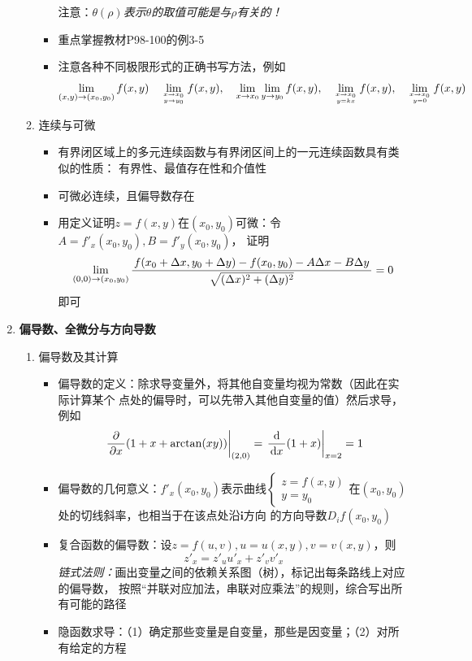 \begin{enumerate}
\begin{enumerate}[(1)]
\begin{itemize}
      注意：{\it $\theta(\rho)$表示$\theta$的取值可能是与$\rho$有关的！}
      \item 重点掌握教材P98-100的例3-5
      \item 注意各种不同极限形式的正确书写方法，例如
      $$\lim\limits_{(x,y)\to(x_0,y_0)}f(x,y)\quad
      \lim\limits_{x\to x_0\atop y\to y_0}f(x,y),\quad
      \lim\limits_{x\to x_0}\lim\limits_{y\to y_0}f(x,y),\quad
      \lim\limits_{x\to x_0\atop y=kx}f(x,y),\quad
      \lim\limits_{x\to x_0\atop y=0}f(x,y)
      $$
    \end{itemize}
    \item 连续与可微
    \begin{itemize}
      \item 有界闭区域上的多元连续函数与有界闭区间上的一元连续函数具有类似的性质：
      有界性、最值存在性和介值性
      \item 可微必连续，且偏导数存在
      \item 用定义证明$z=f(x,y)$在$(x_0,y_0)$可微：令$A=f'_x(x_0,y_0),B=f'_y(x_0,y_0)$，
      证明
      $$\lim\limits_{(0,0)\to(x_0,y_0)}
      \displaystyle\frac{\,{f(x_0+\Delta x,y_0+\Delta y)-f(x_0,y_0)
      -A\Delta x-B\Delta
      y}\,}{\,{\sqrt{(\Delta x)^2+(\Delta y)^2}}\,}=0$$
      即可
    \end{itemize}
  \end{enumerate}
  \item {\bf 偏导数、全微分与方向导数}
  \begin{enumerate}[(1)]
    \item 偏导数及其计算
    \begin{itemize}
      \item 偏导数的定义：除求导变量外，将其他自变量均视为常数（因此在实际计算某个
      点处的偏导时，可以先带入其他自变量的值）然后求导，例如
      $$\left.\displaystyle\frac{\,{\partial}\,}{\,{\partial x}\,}(1+x+\arctan(xy))\right|_{(2,0)}=
      \left.\displaystyle\frac{\,{\mathrm{d}}\,}{\,{\mathrm{d} x}\,}(1+x)\right|_{x=2}=1$$
      \item 偏导数的几何意义：$f'_x(x_0,y_0)$表示曲线$\left\{\begin{array}{l}
      z=f(x,y)\\ y=y_0
      \end{array}\right.$在$(x_0,y_0)$处的切线斜率，也相当于在该点处沿$\bm{i}$方向
      的方向导数$D_if(x_0,y_0)$
      \item 复合函数的偏导数：设$z=f(u,v),u=u(x,y),v=v(x,y)$，则
      $$z'_x=z'_uu'_x+z'_vv'_x$$
      {\it 链式法则：}画出变量之间的依赖关系图（树），标记出每条路线上对应的偏导数，
      按照“并联对应加法，串联对应乘法”的规则，综合写出所有可能的路径
      \item 隐函数求导：（1）确定那些变量是自变量，那些是因变量；（2）对所有给定的方程

\end{itemize}
\end{enumerate}
\end{enumerate}
